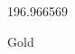 \documentclass[12pt]{article}
\begin{document}
\hfill{}
\vfill
\begin{center}
  {\fontsize{50}{60}
  }

  \vspace{1em}

  196.966569

Gold
\end{center}
\vfill
\end{document}
